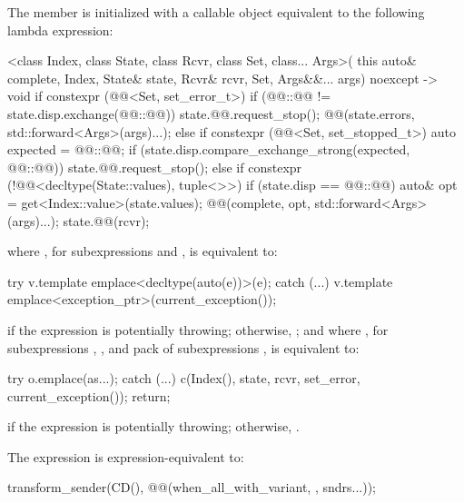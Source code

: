 \pnum
The member 
is initialized with a callable object
equivalent to the following lambda expression:
\begin{codeblock}
[]<class Index, class State, class Rcvr, class Set, class... Args>(
    this auto& complete, Index, State& state, Rcvr& rcvr, Set, Args&&... args) noexcept -> void {
  if constexpr (@@<Set, set_error_t>) {
    if (@@::@@ != state.disp.exchange(@@::@@)) {
      state.@@.request_stop();
      @@(state.errors, std::forward<Args>(args)...);
    }
  } else if constexpr (@@<Set, set_stopped_t>) {
    auto expected = @@::@@;
    if (state.disp.compare_exchange_strong(expected, @@::@@)) {
      state.@@.request_stop();
    }
  } else if constexpr (!@@<decltype(State::values), tuple<>>) {
    if (state.disp == @@::@@) {
      auto& opt = get<Index::value>(state.values);
      @@(complete, opt, std::forward<Args>(args)...);
    }
  }
  state.@@(rcvr);
}
\end{codeblock}
where ,
for subexpressions  and , is equivalent to:
\begin{codeblock}
try {
  v.template emplace<decltype(auto(e))>(e);
} catch (...) {
  v.template emplace<exception_ptr>(current_exception());
}
\end{codeblock}
if the expression  is potentially throwing;
otherwise, ;
and where ,
for subexpressions , , and pack of subexpressions ,
is equivalent to:
\begin{codeblock}
try {
  o.emplace(as...);
} catch (...) {
  c(Index(), state, rcvr, set_error, current_exception());
  return;
}
\end{codeblock}
if the expression 
is potentially throwing;
otherwise, .

\pnum
The expression 
is expression-equivalent to:
\begin{codeblock}
transform_sender(CD(), @@(when_all_with_variant, {}, sndrs...));
\end{codeblock}

